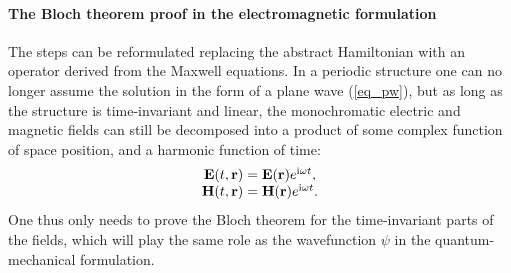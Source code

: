 \paragraph{The Bloch theorem proof in the electromagnetic formulation}%
The steps can be reformulated replacing the abstract Hamiltonian with an operator derived from the Maxwell equations. In a periodic structure one can no longer assume the solution in the form of a plane wave (\ref{eq_pw}), but as long as the structure is time-invariant and linear, the monochromatic electric and magnetic fields can still be decomposed into a product of some complex function of space position, and a harmonic function of time:
\begin{equation} 
\begin{array}{cc}
\mathbf{E}(t, {\mathbf{r}}) = \mathbf{E}({\mathbf{r}}) e^{{\mathrm i} \omega t}, \\
\mathbf{H}(t, {\mathbf{r}}) = \mathbf{H}({\mathbf{r}}) e^{{\mathrm i} \omega t}. 
\end{array}
\label{eq_harmonic}\end{equation}
One thus only needs to prove the Bloch theorem for the time-invariant parts of the fields, which will play the same role as the wavefunction $\psi$ in the quantum-mechanical formulation.

